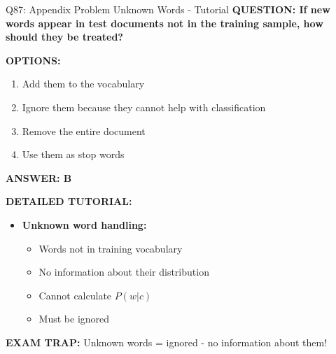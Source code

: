 \documentclass[8pt]{beamer}
\begin{document}
	\begin{frame}{Q87: Appendix Problem Unknown Words - Tutorial}
		\fontsize{6.5}{7.5}\selectfont
		\textbf{QUESTION: If new words appear in test documents not in the training sample, how should they be treated?}
		
		\vspace{0.1cm}
		\textbf{OPTIONS:}
		\begin{enumerate}
			\item Add them to the vocabulary
			\item Ignore them because they cannot help with classification
			\item Remove the entire document
			\item Use them as stop words
		\end{enumerate}
		
		\vspace{0.1cm}
		\textcolor{myblue}{\textbf{ANSWER: B}}
		
		\vspace{0.1cm}
		\textbf{DETAILED TUTORIAL:}
		\begin{itemize}
			\item \textbf{Unknown word handling:}
			\begin{itemize}
				\item Words not in training vocabulary
				\item No information about their distribution
				\item Cannot calculate $P(w|c)$
				\item Must be ignored
			\end{itemize}
		\end{itemize}
		
		\textcolor{myred}{\textbf{EXAM TRAP:}} Unknown words = \textcolor{myblue}{ignored} - no information about them!
	\end{frame}
	
\end{document}
